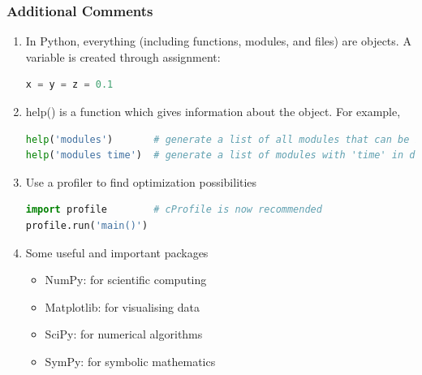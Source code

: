 
\begin{frame}[fragile]
	\MyLogo
	\frametitle{Additional Comments}  
	\small
	
\begin{enumerate}

\item In Python, everything (including functions, modules, and files) are objects. A variable is created through assignment:
\begin{lstlisting}[language=python,numbers=none] 
x = y = z = 0.1
\end{lstlisting}
				
\item help() is a function which gives information about the object. For example, 
\begin{lstlisting}[language=python,numbers=none] 
help('modules')       # generate a list of all modules that can be imported
help('modules time')  # generate a list of modules with 'time' in description
\end{lstlisting}
		
\item Use a profiler to find optimization possibilities
\begin{lstlisting}[language=python,numbers=none] 
import profile        # cProfile is now recommended
profile.run('main()')
\end{lstlisting}

\item Some useful and important packages
	\begin{itemize}\setlength\itemsep{0.25em}
	\item NumPy: for scientific computing
	\item Matplotlib: for visualising data
	\item SciPy: for numerical algorithms
	\item SymPy: for symbolic mathematics
	\end{itemize}
		
\end{enumerate}


\end{frame}


